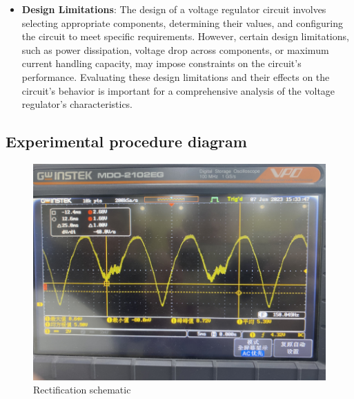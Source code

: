\documentclass[UTF8]{article}
\begin{document}
\begin{itemize}
\item \textbf{Design Limitations}: The design of a voltage regulator circuit involves selecting appropriate components, determining their values, and configuring the circuit to meet specific requirements. However, certain design limitations, such as power dissipation, voltage drop across components, or maximum current handling capacity, may impose constraints on the circuit's performance. Evaluating these design limitations and their effects on the circuit's behavior is important for a comprehensive analysis of the voltage regulator's characteristics.
\end{itemize}

\begin{appendix}
\section{Experimental procedure diagram}
    	\begin{figure}[H]
    	    	\centering
    	    	\includegraphics[clip,scale=0.8,trim={0 0 0 0}]{fig/fig15.png}
    	        \caption{Rectification schematic}
    	        \label{figure.15}
        \end{figure}  


\end{appendix}
\end{document}
